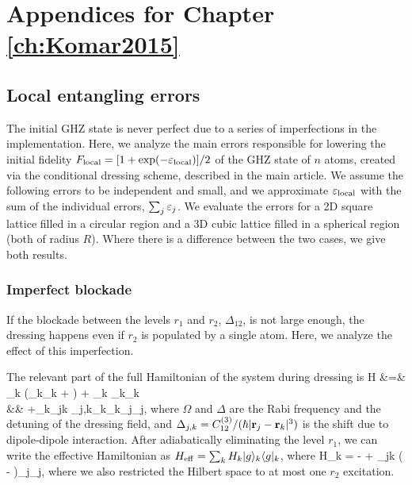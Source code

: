 \chapter{Appendices for Chapter \ref{ch:Komar2015}}
\label{app:Komar2015}


\section{Local entangling errors}
The initial GHZ state is never perfect due to a series of imperfections in the
implementation. Here, we analyze the main errors responsible for lowering the
initial fidelity $F_\mathrm{local} = [1+\exp(-\varepsilon_\mathrm{local})]/2$ of the GHZ
state of $n$ atoms, created via the conditional dressing scheme,  described in
the main article. We assume the following errors to be independent and small,
and we approximate $\varepsilon_\mathrm{local}$ with the sum
of the individual errors, $\sum_j \varepsilon_j$. We evaluate the errors for a 2D
square lattice filled in a circular region and a 3D cubic lattice filled in a
spherical region (both of radius $R$). Where there is
a difference between the two cases, we give both results.
 
\subsection{Imperfect blockade}
\label{sec:imperfect_blockade}
If the blockade between the levels $r_1$ and $r_2$, $\Delta_{12}$, is not large
enough, the dressing happens even if $r_2$ is populated by a single
atom. Here, we analyze the effect of this imperfection.

The relevant part of the full Hamiltonian of the system during dressing is
\bal
	H &=& \sum_k \left(_k_k + \right)
	+ \Delta\sum_k _k_k \\
	&& +\sum_k\sum_{j\neq k}
	\Delta_{j,k}_k_k_j_j,
\eal
where $\Omega$ and $\Delta$ are the Rabi frequency and the detuning of the
dressing field, and $\Delta_{j,k} = C_{12}^{(3)}/(\hbar |{\mathbf r}_j - {\mathbf r}_k|^3)$ is
the shift due to dipole-dipole interaction. 
After adiabatically eliminating the level $r_1$, we can write the effective
Hamiltonian as $H_\mathrm{eff} = \sum_k H_k | g \rangle_k\langle g |_k$, where
\bel
	H_k = - + \sum_{j\neq k}
	\left( - \right)_j_j,
\eel
where we also restricted the Hilbert space to at most one $r_2$ excitation.

